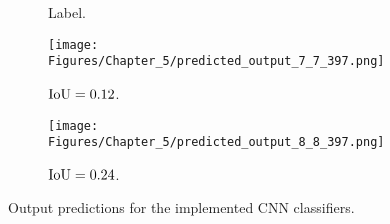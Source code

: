 \begin{figure} [h!]
\begin{subfigure}[b]{0.32\textwidth}
		\caption{Label.}
		\label{fig:GT_case_397}
	\end{subfigure}
	\hfill
	\begin{subfigure}[b]{0.32\textwidth}
		\centering
		\texttt{[image: Figures/Chapter\_5/predicted\_output\_7\_7\_397.png]}
		\caption{\(\textup{IoU}=0.12\).}
		\label{fig:pred_7_7_case_397}
	\end{subfigure}
	\hfill
	\begin{subfigure}[b]{0.32\textwidth}
		\centering
		\texttt{[image: Figures/Chapter\_5/predicted\_output\_8\_8\_397.png]}
		\caption{\(\textup{IoU}=0.24\).}
		\label{fig:pred_8_8_case_397}
	\end{subfigure}
	\caption{Output predictions for the implemented CNN classifiers.}
	\label{fig:bounding_boxes_predictions}
\end{figure}
